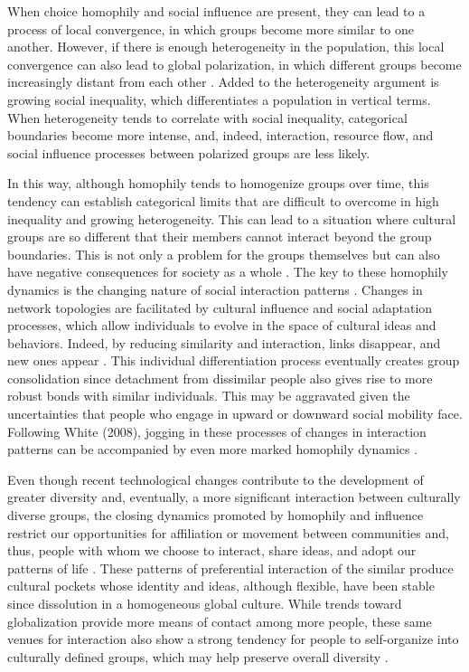 When choice homophily and social influence are present, they can lead to a process of local convergence, in which groups become more similar to one another. However, if there is enough heterogeneity in the population, this local convergence can also lead to global polarization, in which different groups become increasingly distant from each other \parencite{axelrod_dissemination_1997}. Added to the heterogeneity argument is growing social inequality, which differentiates a population in vertical terms. When heterogeneity tends to correlate with social inequality, categorical boundaries become more intense, and, indeed, interaction, resource flow, and social influence processes between polarized groups are less likely.
\bigskip

In this way, although homophily tends to homogenize groups over time, this tendency can establish categorical limits that are difficult to overcome in high inequality and growing heterogeneity. This can lead to a situation where cultural groups are so different that their members cannot interact beyond the group boundaries. This is not only a problem for the groups themselves but can also have negative consequences for society as a whole \parencite{centola_homophily_2007}. The key to these homophily dynamics is the changing nature of social interaction patterns \parencite{feld_describing_2007, centola_spontaneous_2015}. Changes in network topologies are facilitated by cultural influence and social adaptation processes, which allow individuals to evolve in the space of cultural ideas and behaviors. Indeed, by reducing similarity and interaction, links disappear, and new ones appear \parencite{feld_describing_2007, centola_homophily_2007}. This individual differentiation process eventually creates group consolidation since detachment from dissimilar people also gives rise to more robust bonds with similar individuals. This may be aggravated given the uncertainties that people who engage in upward or downward social mobility face. Following White (2008), jogging in these processes of changes in interaction patterns can be accompanied by even more marked homophily dynamics \parencite{blau_exchange_1986, white_identity_2008}.
\bigskip

Even though recent technological changes contribute to the development of greater diversity and, eventually, a more significant interaction between culturally diverse groups, the closing dynamics promoted by homophily and influence restrict our opportunities for affiliation or movement between communities and, thus, people with whom we choose to interact, share ideas, and adopt our patterns of life \parencite{mcpherson_birds_2001,mcpherson_blau_2004}. These patterns of preferential interaction of the similar produce cultural pockets whose identity and ideas, although flexible, have been stable since dissolution in a homogeneous global culture. While trends toward globalization provide more means of contact among more people, these same venues for interaction also show a strong tendency for people to self-organize into culturally defined groups, which may help preserve overall diversity \parencite{centola_homophily_2007}.
\bigskip
 

